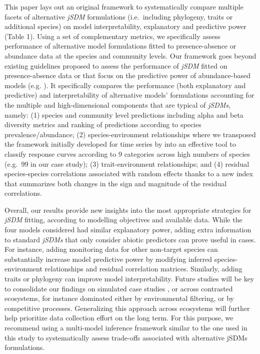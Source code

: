 \begin{refsection}
This paper lays out an original framework to systematically compare
multiple facets of alternative \emph{jSDM} formulations (i.e.~including
phylogeny, traits or additional species) on model interpretability,
explanatory and predictive power (Table 1). Using a set of complementary
metrics, we specifically assess performance of alternative model
formulations fitted to presence-absence or abundance data at the species
and community levels. Our framework goes beyond existing guidelines
proposed to assess the performance of \emph{jSDM} fitted on
presence-absence data \autocite{Wilkinson_2020} or that focus on the
predictive power of abundance-based models (e.g.
\textcite{Waldock_2022}). It specifically compares the performance (both
explanatory and predictive) and interpretability of alternative models'
formulations accounting for the multiple and high-dimensional components
that are typical of \emph{jSDMs}, namely: (1) species and community
level predictions including alpha and beta diversity metrics and ranking
of predictions according to species prevalence/abundance; (2)
species-environment relationships where we transposed the framework
initially developed for time series by \textcite{Rigal_2020} into an
effective tool to classify response curves according to 9 categories
across high numbers of species (e.g.~99 in our case study); (3)
trait-environment relationships; and (4) residual species-species
correlations associated with random effects thanks to a new index that
summarizes both changes in the sign and magnitude of the residual
correlations.

Overall, our results provide new insights into the most appropriate
strategies for \emph{jSDM} fitting, according to modelling objectives
\autocite{Tredennick_2021} and available data. While the four models
considered had similar explanatory power, adding extra information to
standard \emph{jSDMs} that only consider abiotic predictors can prove
useful in cases. For instance, adding monitoring data for other
non-target species can substantially increase model predictive power by
modifying inferred species-environment relationships and residual
correlation matrices. Similarly, adding traits or phylogeny can improve
model interpretability. Future studies will be key to consolidate our
findings on simulated case studies \autocites[
]{Zurell_2010}{DiRenzo_2022}, or across contrasted ecosystems, for
instance dominated either by environmental filtering, or by competitive
processes. Generalizing this approach across ecosystems will further
help prioritize data collection effort on the long term. For this
purpose, we recommend using a multi-model inference framework similar to
the one used in this study to systematically assess trade-offs
associated with alternative jSDMs formulations.

\clearpage

\printbibliography[heading=subbibintoc, title={Bibliographie}]
\end{refsection}